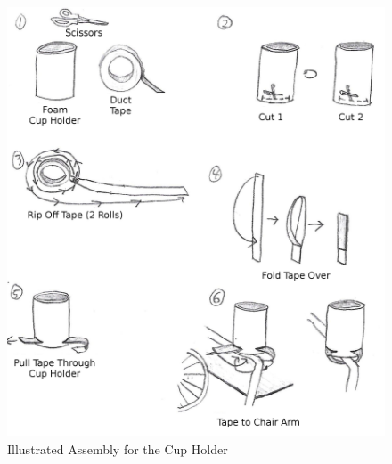 \documentclass[12pt]{report}
\begin{document}
\begin{figure}[H]
    \label{fig:cupholderasm}
    \includegraphics[width=\textwidth]{cupholderasm}
    \caption{Illustrated Assembly for the Cup Holder}
\end{figure}
\end{document}
